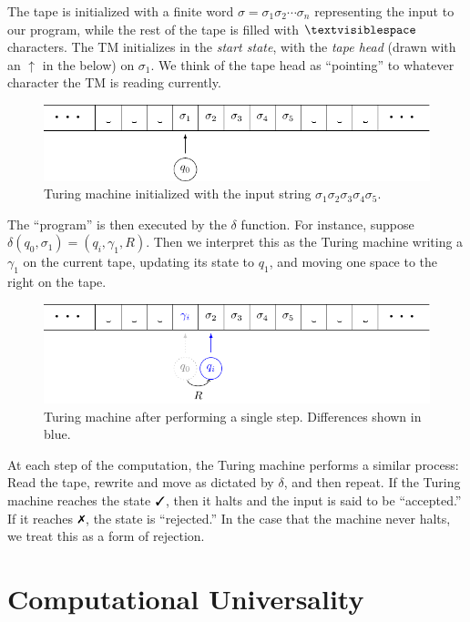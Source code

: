 \documentclass{fkpaper}
\newcommand{\blank}{\textvisiblespace}
\begin{document}
\begin{multicols}{2}
The tape is initialized with a finite word $\sigma = \sigma_1 \sigma_2
\cdots \sigma_n$ representing the input to our program, while the rest
of the tape is filled with $\blank$ characters. The TM initializes in
the \emph{start state}, with the \emph{tape head} (drawn with an
$\uparrow$ in the below) on $\sigma_1$. We think of the tape head as
``pointing'' to whatever character the TM is reading currently.
\begin{figure}[H]
  \centering
  \includegraphics[scale=.7]{figures/tm-initial-input.pdf}
  \caption{Turing machine initialized with the input string $\sigma_1
    \sigma_2 \sigma_3 \sigma_4 \sigma_5$.}
\end{figure}
The ``program'' is then executed by the $\delta$ function. For
instance, suppose $\delta(q_0, \sigma_1) = (q_i, \gamma_1, R)$. Then
we interpret this as the Turing machine writing a $\gamma_1$ on the
current tape, updating its state to $q_1$, and moving one space to the
right on the tape.
\begin{figure}[H]
  \centering
  \includegraphics{figures/tm-one-step-later.pdf}
  \caption{Turing machine after performing a single step. Differences
    shown in {\color{blue} blue}.}
\end{figure}
At each step of the computation, the Turing machine performs a similar
process: Read the tape, rewrite and move as dictated by $\delta$, and
then repeat. If the Turing machine reaches the state $\cmark$, then it
halts and the input is said to be ``accepted.'' If it reaches
$\xmark$, the state is ``rejected.'' {\color{blue} In the case that
  the machine never halts, we treat this as a form of rejection.}




\section{Computational Universality}


\end{multicols}
\end{document}
